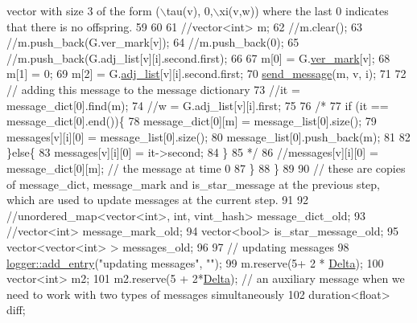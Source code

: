 \begin{DoxyCode}
{       vector with size 3 of the form (\(\backslash\)tau(v), 0,\(\backslash\)xi(v,w)) where the last 0 indicates that there is no offspring.}
59 
60 
61       \textcolor{comment}{//vector<int> m;}
62       \textcolor{comment}{//m.clear();}
63       \textcolor{comment}{//m.push\_back(G.ver\_mark[v]);}
64       \textcolor{comment}{//m.push\_back(0);}
65       \textcolor{comment}{//m.push\_back(G.adj\_list[v][i].second.first);}
66 
67       m[0] = G.\hyperlink{classmarked__graph_ac83e9377dd4d8bb95be1ac949b127296}{ver\_mark}[v];
68       m[1] = 0;
69       m[2] = G.\hyperlink{classmarked__graph_a1a0bf7ca413a278763f7c878b3b6fd6f}{adj\_list}[v][i].second.first;
70       \hyperlink{classgraph__message_aa76d1d5420a12477fa1dddd878d78c8f}{send\_message}(m, v, i);
71 
72       \textcolor{comment}{// adding this message to the message dictionary}
73       \textcolor{comment}{//it = message\_dict[0].find(m);}
74       \textcolor{comment}{//w = G.adj\_list[v][i].first;}
75 
76       \textcolor{comment}{/*}
77 \textcolor{comment}{      if (it == message\_dict[0].end())\{}
78 \textcolor{comment}{        message\_dict[0][m] = message\_list[0].size();}
79 \textcolor{comment}{        messages[v][i][0] = message\_list[0].size();}
80 \textcolor{comment}{        message\_list[0].push\_back(m);}
81 \textcolor{comment}{}
82 \textcolor{comment}{      \}else\{}
83 \textcolor{comment}{        messages[v][i][0] = it->second;}
84 \textcolor{comment}{      \}}
85 \textcolor{comment}{      */}
86       \textcolor{comment}{//messages[v][i][0] = message\_dict[0][m]; // the message at time 0}
87     \}
88   \}
89 
90   \textcolor{comment}{// these are copies of message\_dict, message\_mark and is\_star\_message at the previous step, which are
       used to update messages at the current step.}
91 
92   \textcolor{comment}{//unordered\_map<vector<int>, int, vint\_hash> message\_dict\_old;}
93   \textcolor{comment}{//vector<int> message\_mark\_old;}
94   vector<bool> is\_star\_message\_old;
95   vector<vector<int> > messages\_old;
96 
97   \textcolor{comment}{// updating messages}
98   \hyperlink{classlogger_a710163deb17bc81f70d53d285b8ac9ac}{logger::add\_entry}(\textcolor{stringliteral}{"updating messages"}, \textcolor{stringliteral}{""});
99   m.reserve(5+ 2 * \hyperlink{classgraph__message_a45dfd061b7bc73572e5132fbf66efd55}{Delta});
100   vector<int> m2;
101   m2.reserve(5 + 2*\hyperlink{classgraph__message_a45dfd061b7bc73572e5132fbf66efd55}{Delta}); \textcolor{comment}{// an auxiliary message when we need to work with two types of messages
       simultaneously }
102   duration<float> diff;

\end{DoxyCode}
